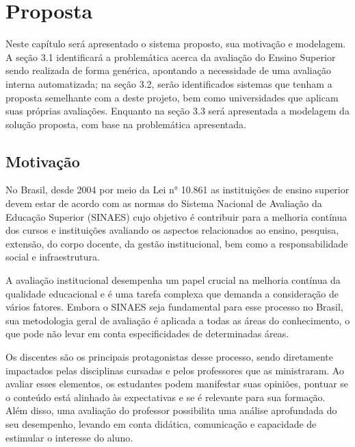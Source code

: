 \chapter{Proposta}\label{chp:PROPOSTA}


Neste capítulo será apresentado o sistema proposto, sua motivação e modelagem.
A seção 3.1 identificará a problemática acerca da avaliação do Ensino Superior sendo realizada de forma genérica, apontando a necessidade de uma avaliação interna automatizada;
na seção 3.2, serão identificados sistemas que tenham a proposta semelhante com a deste projeto, bem como universidades que aplicam suas próprias avaliações.
Enquanto na seção 3.3 será apresentada a modelagem da solução proposta, com base na problemática apresentada.

\section{Motivação}


No Brasil, desde 2004 por meio da Lei n° 10.861 as instituições de ensino superior devem estar de acordo com as normas do Sistema Nacional de Avaliação da Educação Superior (SINAES)
cujo objetivo é contribuir para a melhoria contínua dos cursos e instituições avaliando 
os aspectos relacionados ao ensino, pesquisa, extensão, do corpo docente, da gestão institucional, bem como a responsabilidade social e infraestrutura.


A avaliação institucional desempenha um papel crucial na melhoria contínua da qualidade educacional
e é uma tarefa complexa que demanda a consideração de vários fatores. Embora o SINAES seja fundamental para esse processo no Brasil, sua metodologia geral de avaliação é aplicada a todas as áreas do conhecimento, o que pode não levar em conta especificidades de determinadas áreas.


Os discentes são os principais protagonistas desse processo, sendo diretamente impactados pelas disciplinas cursadas e pelos professores que as ministraram. Ao avaliar esses elementos, os estudantes podem manifestar suas opiniões, pontuar se o conteúdo está alinhado às expectativas e se é relevante para sua formação. Além disso, uma avaliação do professor possibilita uma análise aprofundada do seu desempenho, levando em conta didática, comunicação e capacidade de estimular o interesse do aluno.

